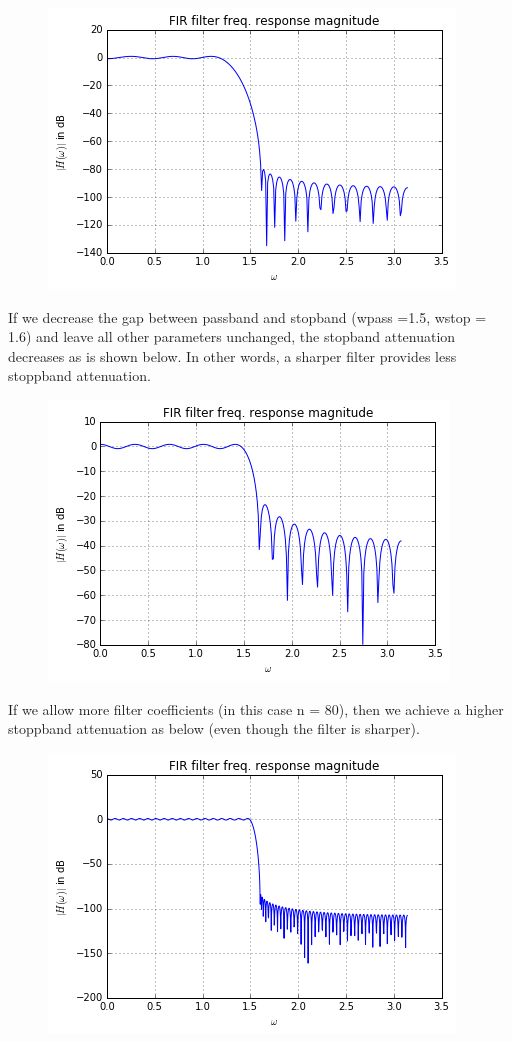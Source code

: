 \begin{figure}[H]
\centering
\includegraphics{images/fir_design_1.png}
\end{figure}

If we decrease the gap between passband and stopband (wpass =1.5, wstop
= 1.6) and leave all other parameters unchanged, the stopband
attenuation decreases as is shown below. In other words, a sharper
filter provides less stoppband attenuation.

\begin{figure}[H]
\centering
\includegraphics{images/fir_design_2.png}
\end{figure}

If we allow more filter coefficients (in this case n = 80), then we
achieve a higher stoppband attenuation as below (even though the filter
is sharper).

\begin{figure}[H]
\centering
\includegraphics{images/fir_design_3.png}
\end{figure}
